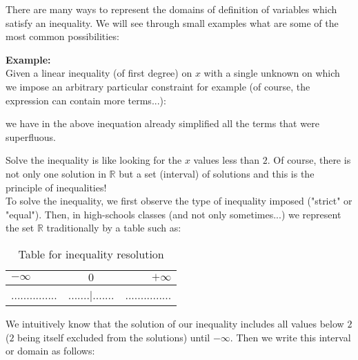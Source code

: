 	There are many ways to represent the domains of definition of variables which satisfy an inequality. We will see through small examples what are some of the  most common possibilities:
	\begin{tcolorbox}[colframe=black,colback=white,sharp corners]
\textbf{{\Large {}}Example:}\\
	Given a linear inequality (of first degree) on $x$ with a single unknown on which we impose an arbitrary particular constraint for example (of course, the expression can contain more terms...):
	
	we have in the above inequation already simplified all the terms that were superfluous.
	
	Solve the inequality is like looking for the $x$ values less than $2$. Of course, there is not only one solution in $\mathbb{R}$ but a set (interval) of solutions and this is the principle of inequalities!\\
	
	To solve the inequality, we first observe the type of inequality imposed ("strict" or "equal"). Then, in high-schools classes (and not only sometimes...) we represent the set $\mathbb{R}$ traditionally by a table such as:
	\begin{table}[H]
		\begin{center}
		\begin{tabular}{|l|c|r|}
		\hline 
		{\cellcolor{black!30}$-\infty$} & {\cellcolor{black!30}$0$} & {\cellcolor{black!30}$+\infty$}\\ 
		\hline 
		............... & .......|....... & ............... \\  
		\hline 
		\end{tabular} 
		\end{center}
		\caption{Table for inequality resolution}
	\end{table}
	We intuitively know that the solution of our inequality includes all values below $2$ ($2$ being itself excluded from the solutions) until $-\infty$. Then we write this interval or domain as follows:
	

\end{tcolorbox}
